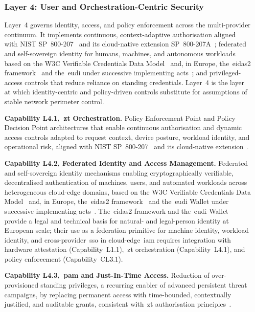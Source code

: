 \documentclass{ieeeaccess}
\begin{document}
\subsubsection{Layer 4: User and Orchestration-Centric Security}
\label{sec:L4}

Layer~4 governs identity, access, and policy enforcement across the multi-provider continuum. It implements continuous, context-adaptive authorisation aligned with NIST SP~800-207~\cite{rose2020zta} and its cloud-native extension SP~800-207A~\cite{chandramouli2023zta}; federated and self-sovereign identity for humans, machines, and autonomous workloads based on the W3C Verifiable Credentials Data Model~\cite{w3cvc2025} and, in Europe, the~\gls{eidas2} framework~\cite{eueidas2} and the~\gls{eudi} under successive implementing acts~\cite{eudiwallet2024,eudiwallet2026}; and privileged-access controls that reduce reliance on standing credentials. Layer~4 is the layer at which identity-centric and policy-driven controls substitute for assumptions of stable network perimeter control.

\textbf{Capability L4.1,~\gls{zt} Orchestration.} Policy Enforcement Point and Policy Decision Point architectures that enable continuous authorisation and dynamic access controls adapted to request context, device posture, workload identity, and operational risk, aligned with NIST SP~800-207~\cite{rose2020zta} and its cloud-native extension~\cite{chandramouli2023zta}.

\textbf{Capability L4.2, Federated Identity and Access Management.} Federated and self-sovereign identity mechanisms enabling cryptographically verifiable, decentralised authentication of machines, users, and automated workloads across heterogeneous cloud-edge domains, based on the W3C Verifiable Credentials Data Model~\cite{w3cvc2025} and, in Europe, the~\gls{eidas2} framework~\cite{eueidas2} and the~\gls{eudi} Wallet under successive implementing acts~\cite{eudiwallet2024,eudiwallet2026}. The~\gls{eidas2} framework and the~\gls{eudi} Wallet provide a legal and technical basis for natural- and legal-person identity at European scale; their use as a federation primitive for machine identity, workload identity, and cross-provider~\gls{sso} in cloud-edge~\gls{iam} requires integration with hardware attestation (Capability~L1.1),~\gls{zt} orchestration (Capability~L4.1), and policy enforcement (Capability~CL3.1).

\textbf{Capability L4.3,~\acrfull{pam} and Just-In-Time Access.} Reduction of over-provisioned standing privileges, a recurring enabler of advanced persistent threat campaigns, by replacing permanent access with time-bounded, contextually justified, and auditable grants, consistent with~\gls{zt} authorisation principles~\cite{rose2020zta,chandramouli2023zta}.
\end{document}
